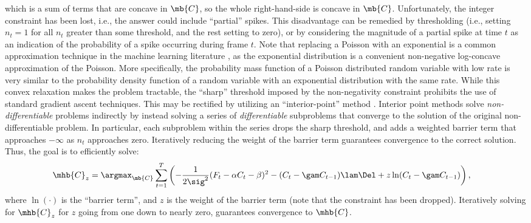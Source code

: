 \noindent which is a sum of terms that are concave in $\mb{C}$, so the whole right-hand-side is concave in $\mb{C}$. Unfortunately, the integer constraint has been lost, i.e.,  the answer could include ``partial'' spikes.  This disadvantage can be remedied by thresholding (i.e., setting $n_t=1$ for all $n_t$ greater than some threshold, and the rest setting to zero), or by considering the magnitude of a partial spike at time $t$ as an indication of the probability of a spike occurring during frame $t$. Note that replacing a Poisson with an exponential is a common approximation technique in the machine learning literature \cite{CONV04, PaninskiWu09}, as the exponential distribution is a convenient non-negative log-concave approximation of the Poisson. More specifically, the probability mass function of a Poisson distributed random variable with low rate is very similar to the probability density function of a random variable with an exponential distribution with the same rate. While this convex relaxation makes the problem tractable, the ``sharp'' threshold imposed by the non-negativity constraint prohibits the use of standard gradient ascent techniques. This may be rectified by utilizing an ``interior-point'' method  \cite{CONV04}.  Interior point methods solve \emph{non-differentiable} problems indirectly by instead solving a series of \emph{differentiable} subproblems that converge to the solution of the original non-differentiable problem.  In particular, each subproblem within the series drops the sharp threshold, and adds a weighted barrier term that approaches $-\infty$ as $n_t$ approaches zero. Iteratively reducing the weight of the barrier term guarantees convergence to the correct solution.  Thus, the goal is to efficiently solve:
\begin{align} \label{eq:eta}
\mhb{C}_{\zzz} &= \argmax_{\mb{C}}  \sum_{t=1}^T \left( -\frac{1}{2 \sig^2}(F_t - \alpha C_t - \beta)^2  -  (C_t-\gam C_{t-1})  \lam \Del + \zzz \ln (C_t-\gam C_{t-1}) \right),
\end{align}
\noindent where $\ln (\cdot)$ is the ``barrier term'', and $z$ is the weight of the barrier term (note that the constraint has been dropped).  Iteratively solving for $\mhb{C}_{\zzz}$ for $z$ going from one down to nearly zero, guarantees convergence to $\mhb{C}$. %
